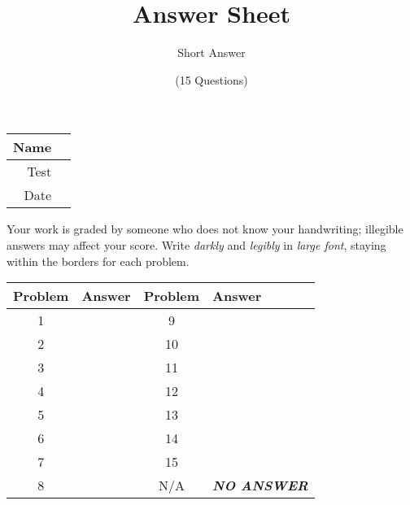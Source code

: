 \documentclass[a4paper, 12pt]{article}
\title{Answer Sheet}
\author{Short Answer}
\date{(15 Questions)}
\begin{document}
\maketitle

\begin{center}
\begin{tabular}{|r|r|}
\hline
	\hspace{3em} Name & \hspace{30em} \\\hline
	Test & \qquad \\ \hline
	Date & \qquad \\ \hline
\end{tabular}
\end{center}

Your work is graded by someone who does not know your handwriting; illegible answers may affect your score. Write \emph{darkly} and \emph{legibly} in \emph{large font}, staying within the borders for each problem.

\begin{center}
\begin{tabularx}{\textwidth}{|c|l|c|X|}\hline
	Problem & Answer & Problem & Answer \\\hline
	1 & \hspace{13.45em} & 9 & \\\hline
	2 & & 10 & \\\hline
	3 & & 11 & \\\hline
	4 & & 12 & \\\hline
	5 & & 13 & \\\hline
	6 & & 14 & \\\hline
	7 & & 15 & \\\hline
	8 & & N/A & \hspace{35px}\emph{\textbf{NO ANSWER}} \\\hline
\end{tabularx}
\end{center}
\end{document}
